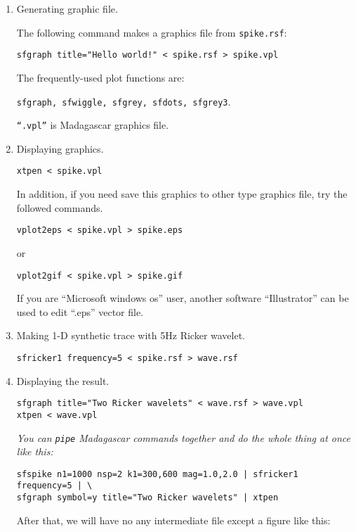 \begin{enumerate}
{\begin{enumerate}
\item Generating graphic file.

The following command makes a graphics file from \texttt{spike.rsf}:
\begin{verbatim}
sfgraph title="Hello world!" < spike.rsf > spike.vpl
\end{verbatim}
The frequently-used plot functions are:

\texttt{sfgraph, sfwiggle, sfgrey, sfdots, sfgrey3}.

\texttt{``.vpl''} is Madagascar graphics file.

\item Displaying graphics.
\begin{verbatim}
xtpen < spike.vpl
\end{verbatim}

In addition, if you need save this graphics to other type graphics file,
try the followed commands.
\begin{verbatim}
vplot2eps < spike.vpl > spike.eps
\end{verbatim} 
or
\begin{verbatim}
vplot2gif < spike.vpl > spike.gif
\end{verbatim}

If you are ``Microsoft windows os'' user, another software ``Illustrator''
can be used to edit ``.eps'' vector file. 

\item Making 1-D synthetic trace with 5Hz Ricker wavelet.
\begin{verbatim}
sfricker1 frequency=5 < spike.rsf > wave.rsf
\end{verbatim}

\item Displaying the result.
\begin{verbatim}
sfgraph title="Two Ricker wavelets" < wave.rsf > wave.vpl
xtpen < wave.vpl
\end{verbatim}

\emph{You can \texttt{pipe} Madagascar commands together and do the whole 
thing at once like this:}
\begin{verbatim}
sfspike n1=1000 nsp=2 k1=300,600 mag=1.0,2.0 | sfricker1 frequency=5 | \
sfgraph symbol=y title="Two Ricker wavelets" | xtpen
\end{verbatim}

After that, we will have no any intermediate file except a figure like this:



\end{enumerate}}
\end{enumerate}
